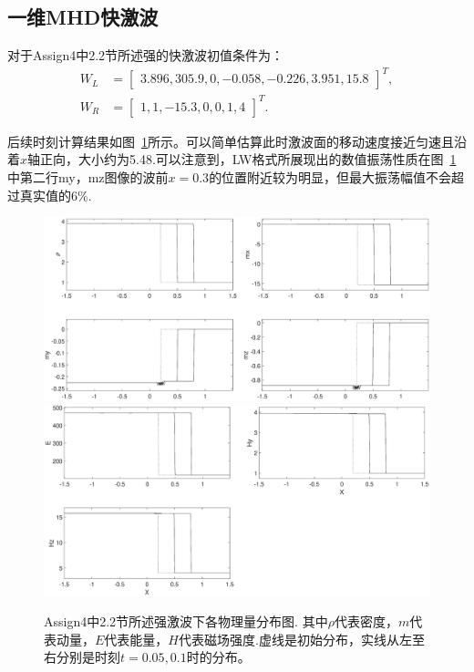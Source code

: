 \documentclass{article}
\begin{document}
\subsection{一维MHD快激波}
对于Assign4中2.2节所述强的快激波初值条件为：
\begin{align}
W_L &= \left[\begin{array}{cccccc}
3.896,
305.9,
0,
-0.058,
-0.226,
3.951,
15.8
\end{array}\right]^T,
\nonumber\\
W_R &= \left[\begin{array}{ccccccc}
1,
1,
-15.3,
0,
0,
1,
4
\end{array}\right]^T.\label{Eqn:Fast}
\end{align}
\par
后续时刻计算结果如图~\ref{fig:2.2mix}所示。可以简单估算此时激波面的移动速度接近匀速且沿着$x$轴正向，大小约为5.48.可以注意到，LW格式所展现出的数值振荡性质在图~\ref{fig:2.2mix}中第二行my，mz图像的波前$x=0.3$的位置附近较为明显，但最大振荡幅值不会超过真实值的6\%.
\begin{figure}[H]
    \centering
    \includegraphics[width=.75\textwidth]{2.2LW1.eps}
    \includegraphics[width=.75\textwidth]{2.2LW2.eps}
    \caption{Assign4中2.2节所述强激波下各物理量分布图. 其中$\rho$代表密度，$m$代表动量，$E$代表能量，$H$代表磁场强度.虚线是初始分布，实线从左至右分别是时刻$t=0.05, 0.1$时的分布。}
    \label{fig:2.2mix}
\end{figure}
\end{document}
